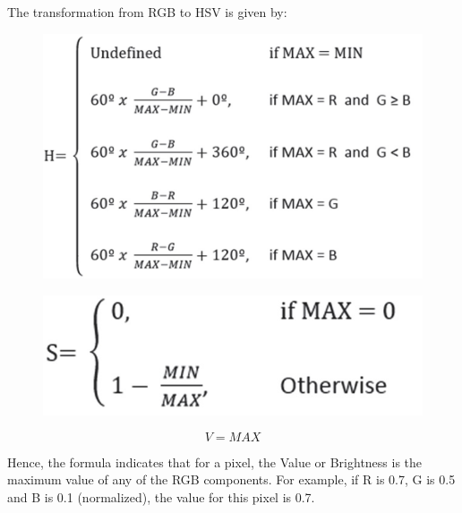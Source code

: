 The transformation from RGB to HSV is given by:

\begin{figure}
  	\includegraphics[scale=0.4]{images/ch2/H.jpg}
  	\label{fig:H}
\end{figure}

\begin{figure}
  	\includegraphics[scale=0.4]{images/ch2/S.jpg}
  	\label{fig:S}
\end{figure}

\begin{equation}
	V=MAX
\end{equation}

Hence, the formula indicates that for a pixel, the Value or Brightness is the maximum value of any of the RGB components. For example, if R is 0.7, G is 0.5 and B is 0.1 (normalized), the value for this pixel is 0.7.


